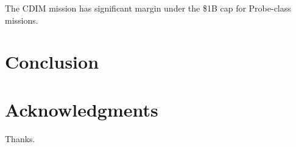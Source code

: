 \documentclass{ws-jai}
\begin{document}
The CDIM mission has significant margin under the \$1B cap for Probe-class missions.

\clearpage

\section{Conclusion}
\label{sec:conclusion}

\section*{Acknowledgments}
Thanks.


\end{document}
